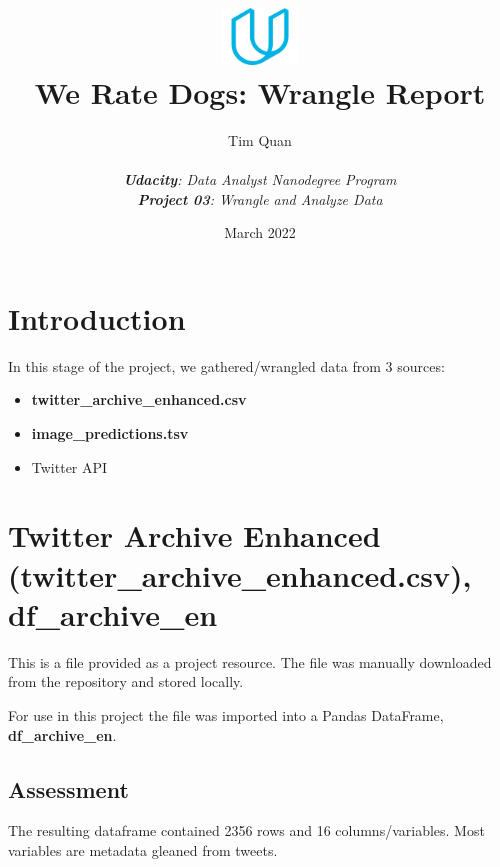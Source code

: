 \documentclass{report}
\title{\includegraphics[width=2cm]{udacity-logo.png}\\We Rate Dogs: Wrangle Report}
\date{March 2022}
\author{Tim Quan\\ \\ 
	\textit{\textbf{Udacity}: Data Analyst Nanodegree Program}\\ 
	\textit{\textbf{Project 03}: Wrangle and Analyze Data}}
\begin{document}
\maketitle




\section{Introduction}

In this stage of the project, we gathered/wrangled data from 3 sources:
\begin{itemize}
	\item \textbf{twitter\_archive\_enhanced.csv}
	\item \textbf{image\_predictions.tsv}
	\item Twitter API
\end{itemize}

\section{Twitter Archive Enhanced \textbf{(twitter\_archive\_enhanced.csv), }\textbf{df\_archive\_en}}

This is a file provided as a project resource.
The file was manually downloaded from the repository and stored locally.

For use in this project the file was imported into a Pandas DataFrame, \textbf{df\_archive\_en}.

	\subsection{Assessment}
	The resulting dataframe contained 2356 rows and 16 columns/variables. Most variables are metadata gleaned from tweets. 
\end{document}
